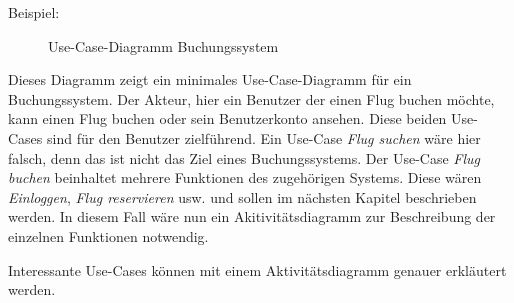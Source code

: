 Beispiel:

\begin{figure}[ht]
\centering
\caption{Use-Case-Diagramm Buchungssystem}
\end{figure}

Dieses Diagramm zeigt ein minimales Use-Case-Diagramm für ein Buchungssystem.
Der Akteur, hier ein Benutzer der einen Flug buchen möchte, kann einen Flug buchen oder
sein Benutzerkonto ansehen. Diese beiden Use-Cases sind für den Benutzer zielführend.
Ein Use-Case \emph{Flug suchen} wäre hier falsch, denn das ist nicht das Ziel eines Buchungssystems. 
Der Use-Case \emph{Flug buchen} beinhaltet mehrere Funktionen des zugehörigen Systems. 
Diese wären \emph{Einloggen}, \emph{Flug reservieren} usw. und sollen im nächsten Kapitel beschrieben werden. 
In diesem Fall wäre nun ein Akitivitätsdiagramm zur Beschreibung der einzelnen Funktionen notwendig. 


Interessante Use-Cases können mit einem Aktivitätsdiagramm genauer erkläutert werden.
